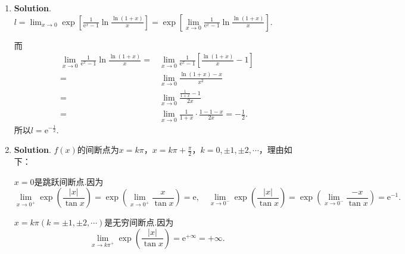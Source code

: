 \documentclass[../main.tex]{subfiles}
\begin{document}
\begin{enumerate}
          \[
              \begin{aligned}
                  b = {} & \lim_{x\to+\infty}\left(\sqrt{2x^2+4x-1}-ax\right)=\lim_{x\to\infty}\left(\sqrt{2x^2+4x-1}-\sqrt{2}x\right) \\
                  = {}   & \lim_{x\to+\infty}\sqrt{2}x\left[\sqrt{1+\left(\frac{2}{x}-\frac{1}{2x^2}\right)}-1\right]                  \\
                  = {}   & \lim_{x\to+\infty}\sqrt{2}x\cdot\frac{1}{2}\left(\frac{2}{x}-\frac{1}{2x^2}\right)=\sqrt{2}.
              \end{aligned}
          \]

    \item \textbf{Solution}. $l=\lim_{x\to0}\exp\left[{\frac{1}{\mathrm{e}^{x}-1}\ln\frac{\ln(1+x)}{x}}\right]
              =\exp\left[{\lim\limits_{x\to0}\frac{1}{\mathrm{e}^{x}-1}\ln\frac{\ln(1+x)}{x}}\right]$.

          而
          \[
              \begin{aligned}
                  \lim_{x\to0}\frac{1}{\mathrm{e}^x-1}\ln\frac{\ln(1+x)}{x}= {} & \lim_{x\to0}\frac{1}{\mathrm{e}^x-1}\left[\frac{\ln(1+x)}{x}-1\right] \\
                  = {}                                                          & \lim_{x\to0}\frac{\ln(1+x)-x}{x^2}                                     \\
                  = {}                                                          & \lim_{x\to0}\frac{\frac{1}{1+x}-1}{2x}                                \\
                  = {}                                                          & \lim_{x\to0}\frac{1}{1+x}\cdot\frac{1-1-x}{2x}=-\frac{1}{2}.
              \end{aligned}
          \]
          所以$l=\mathrm{e}^{-\frac{1}{2}}$.

    \item \textbf{Solution}. $f(x)$的间断点为$x=k\pi$，$x=k\pi+\frac{\pi}{2}$，$k
              =0,\pm1,\pm2,\cdots$，理由如下：

          $x=0$是跳跃间断点.因为
          \[
              \lim_{x\to0^+}\exp\left({\frac{|x|}{\tan x}}\right)=\exp\left({\lim\limits_{x\to0^+}\frac{x}{\tan
                      x}}\right)=\mathrm{e},\quad \lim_{x\to0^-}\exp\left({\frac{|x|}{\tan x}}\right)=\exp\left({\lim_{x\to0^-}\frac{-x}{\tan x}}\right)=\mathrm{e}^{-1}.
          \]

          $x=k\pi(k=\pm1,\pm2,\cdots)$是无穷间断点.因为
          \[
              \lim_{x\to k\pi^+}\exp\left({\frac{|x|}{\tan x}}\right)=\mathrm{e}^{+\infty}=+\infty
              .
          \]


\end{enumerate}
\end{document}
